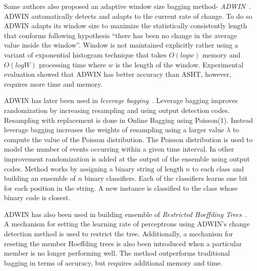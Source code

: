 Same authors also proposed an adaptive window size bagging method- \textit{ADWIN}~\cite{bifet09:asht}. ADWIN automatically detects and adapts to the current rate of change. To do so ADWIN adapts its window size to maximize the statistically consistently length that conforms following hypothesis ``there has been no change in the average value inside the window''. Window is not maintained explicitly rather using a variant of exponential histogram technique that takes $O(log w)$ memory and $O(log W)$ processing time where $w$ is the length of the window. Experimental evaluation showed that ADWIN has better accuracy than ASHT, however, requires more time and memory. 

ADWIN has later been used in \textit{leverage bagging}~\cite{bifet10:levbag}. Leverage bagging improves randomization by increasing resampling and using output detection codes. Resampling with replacement is done in Online Bagging using Poisson(1). Instead leverage bagging increases the weights of resampling using a larger value $\lambda$ to compute the value of the Poisson distribution. The Poisson distribution is used to model the number of events occurring within a given time interval. In other improvement randomization is added at the output of the ensemble using output codes. Method works by assigning a binary string of length $n$ to each class and building an ensemble of $n$ binary classifiers. Each of the classifiers learns one bit for each position in the string. A new instance is classified to the class whose binary code is closest. 

ADWIN has also been used in building ensemble of \textit{Restricted Hoeffding Trees}~\cite{bifet10:rht}. A mechanism for setting the learning rate of perceptrons using ADWIN's change detection method is used to restrict the tree. Additionally, a mechanism for reseting the member Hoeffding trees is also been introduced when a particular member is no longer performing well. The method outperforms traditional bagging in terms of accuracy, but requires additional memory and time.

